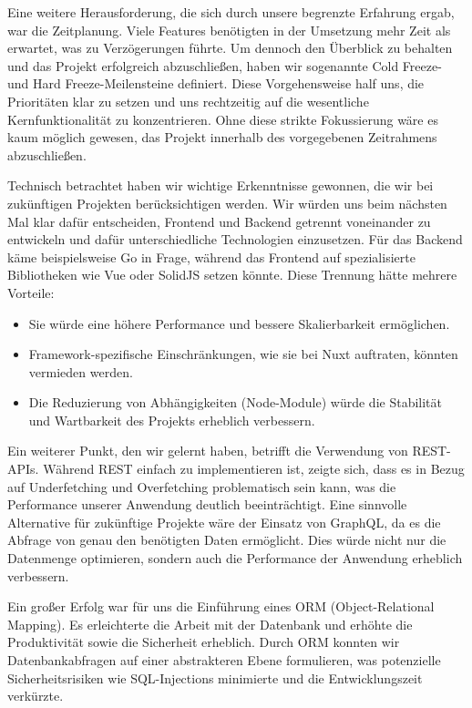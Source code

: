 \documentclass[a4paper,12pt]{article}
\begin{document}
Eine weitere Herausforderung, die sich durch unsere begrenzte Erfahrung ergab, war die Zeitplanung. Viele Features benötigten in der Umsetzung mehr Zeit als erwartet, was zu Verzögerungen führte. Um dennoch den Überblick zu behalten und das Projekt erfolgreich abzuschließen, haben wir sogenannte Cold Freeze- und Hard Freeze-Meilensteine definiert. Diese Vorgehensweise half uns, die Prioritäten klar zu setzen und uns rechtzeitig auf die wesentliche Kernfunktionalität zu konzentrieren. Ohne diese strikte Fokussierung wäre es kaum möglich gewesen, das Projekt innerhalb des vorgegebenen Zeitrahmens abzuschließen.

Technisch betrachtet haben wir wichtige Erkenntnisse gewonnen, die wir bei zukünftigen Projekten berücksichtigen werden. Wir würden uns beim nächsten Mal klar dafür entscheiden, Frontend und Backend getrennt voneinander zu entwickeln und dafür unterschiedliche Technologien einzusetzen. Für das Backend käme beispielsweise Go in Frage, während das Frontend auf spezialisierte Bibliotheken wie Vue oder SolidJS setzen könnte. Diese Trennung hätte mehrere Vorteile:

\begin{itemize}
    \item Sie würde eine höhere Performance und bessere Skalierbarkeit ermöglichen.
    \item Framework-spezifische Einschränkungen, wie sie bei Nuxt auftraten, könnten vermieden werden.
    \item Die Reduzierung von Abhängigkeiten (Node-Module) würde die Stabilität und Wartbarkeit des Projekts erheblich verbessern.
\end{itemize}

Ein weiterer Punkt, den wir gelernt haben, betrifft die Verwendung von REST-APIs. Während REST einfach zu implementieren ist, zeigte sich, dass es in Bezug auf Underfetching und Overfetching problematisch sein kann, was die Performance unserer Anwendung deutlich beeinträchtigt. Eine sinnvolle Alternative für zukünftige Projekte wäre der Einsatz von GraphQL, da es die Abfrage von genau den benötigten Daten ermöglicht. Dies würde nicht nur die Datenmenge optimieren, sondern auch die Performance der Anwendung erheblich verbessern.

Ein großer Erfolg war für uns die Einführung eines ORM (Object-Relational Mapping). Es erleichterte die Arbeit mit der Datenbank und erhöhte die Produktivität sowie die Sicherheit erheblich. Durch ORM konnten wir Datenbankabfragen auf einer abstrakteren Ebene formulieren, was potenzielle Sicherheitsrisiken wie SQL-Injections minimierte und die Entwicklungszeit verkürzte.
\end{document}
